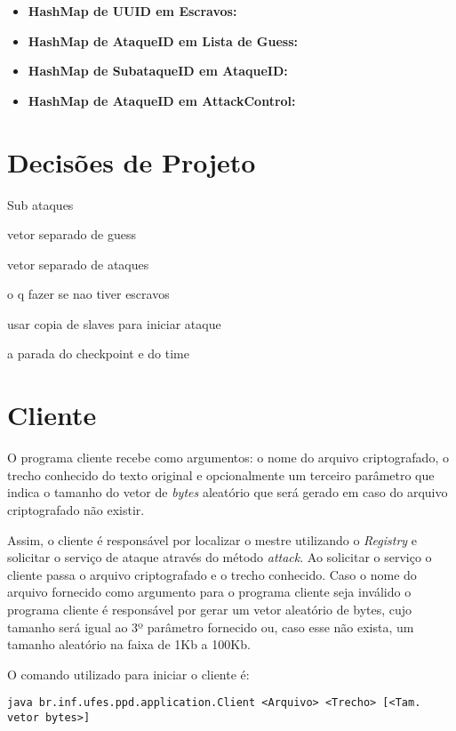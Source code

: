 \documentclass[
	12pt,				%
    oneside,			%
	a4paper,			%
	english,			%
	brazil,				%
	]{abntex2}
\begin{document}
\begin{itemize}


	\item \textbf{HashMap de UUID em Escravos:}
	
	\item \textbf{HashMap de AtaqueID em Lista de Guess:}
	
	\item \textbf{HashMap de SubataqueID em AtaqueID:}
	
	\item \textbf{HashMap de AtaqueID em AttackControl:}
	
\end{itemize}




\section{Decisões de Projeto}
Sub ataques

vetor separado de guess

vetor separado de ataques

o q fazer se nao tiver escravos

usar copia de slaves para iniciar ataque

a parada do checkpoint e do time


\section{Cliente}

O programa cliente recebe como argumentos: o nome do arquivo criptografado, o trecho conhecido do texto original e opcionalmente um terceiro parâmetro que indica o tamanho do vetor de \textit{bytes} aleatório que será gerado em caso do arquivo criptografado não existir.

Assim, o cliente é responsável por localizar o mestre utilizando o \textit{Registry} e solicitar o serviço de ataque através do método \textit{attack}. Ao solicitar o serviço o cliente passa o arquivo criptografado e o trecho conhecido. Caso o nome do arquivo fornecido como argumento para o programa cliente seja inválido o programa cliente é responsável por gerar um vetor aleatório de bytes, cujo tamanho será igual ao 3º parâmetro fornecido ou, caso esse não exista, um tamanho aleatório na faixa de 1Kb a 100Kb.

O comando utilizado para iniciar o cliente é:

\begin{lstlisting}
java br.inf.ufes.ppd.application.Client <Arquivo> <Trecho> [<Tam. vetor bytes>]\end{lstlisting}
\end{document}
